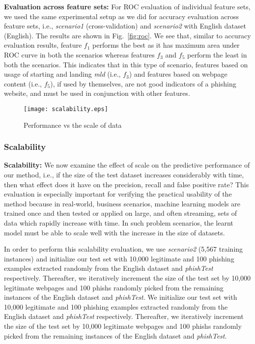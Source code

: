 \documentclass[10pt,conference,compsocconf,letterpaper]{IEEEtran}
\begin{document}
\iffeateval
\textbf{Evaluation across feature sets:} For ROC evaluation of individual feature sets, we used the same experimental setup as we did for accuracy evaluation across feature sets, i.e., \textit{scenario1} (cross-validation) and \textit{scenario2} with English dataset (English). 
The results are shown in Fig.~\ref{fig:roc}. We see that, similar to accuracy evaluation results, feature $f_1$ performs the best as it has maximum area under ROC curve in both the scenarios whereas features $f_3$ and $f_5$ perform the least in both the scenarios. This indicates that in this type of scenario, features based on usage of starting and landing \textit{mld} (i.e., $f_3$) and features based on webpage content (i.e., $f_5$), if used by themselves, are not good indicators of a phishing website, and must be used in conjunction with other features.
\fi

\begin{figure}[th]
                \centering
                \texttt{[image: scalability.eps]}
                \caption{Performance vs the scale of data}
                \label{fig:scalability-eval}
\end{figure} 


\iffeateval
\subsubsection{Scalability}
\else
\noindent\textbf{Scalability:}
\fi
We now examine the effect of scale on the predictive performance of our method, i.e., if the size of the test dataset increases considerably with time, then what effect does it have on the precision, recall and false positive rate?
\iffeateval
This evaluation is especially important for verifying the practical usability of the method because in real-world, business scenarios,  machine learning models are trained once and then tested or applied on large, and often streaming, sets of data which rapidly increase with time. In such problem scenarios, the learnt model must be able to scale well with the increase in the size of datasets.

In order to perform this scalability evaluation, we use \textit{scenario2} (5,567 training instances) and initialize our test set with 10,000 legitimate and 100 phishing examples extracted randomly from the English dataset and \textit{phishTest} respectively. Thereafter, we iteratively increment the size of the test set by 10,000 legitimate webpages and 100 phishs randomly picked from the remaining instances of the English dataset and \textit{phishTest}.
\else
We initialize our test set with 10,000 legitimate and 100 phishing examples extracted randomly from the English dataset and \textit{phishTest} respectively. Thereafter, we iteratively increment the size of the test set by 10,000 legitimate webpages and 100 phishs randomly picked from the remaining instances of the English dataset and \textit{phishTest}.
\fi
\end{document}
